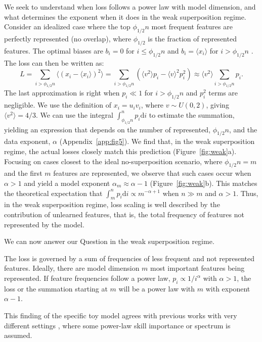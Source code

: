 \documentclass{article}
\begin{document}
We seek to understand when loss follows a power law with model dimension, and what determines the exponent when it does in the weak superposition regime.
Consider an idealized case where the top $\phi_{1/2} n$ most frequent features are perfectly represented (no overlap), where $\phi_{1/2}$ is the fraction of represented features. 
The optimal biases are $b_i = 0$ for $i\leq \phi_{1/2} n$ and $b_i = \langle x_i \rangle$ for $i > \phi_{1/2} n$ \cite{elhage2022superposition}.
The loss can then be written as:
\begin{equation}
L = \sum_{i>\phi_{1/2} n} \langle (x_i - \langle x_i \rangle)^2 \rangle =  \sum_{i>\phi_{1/2} n} (\langle v^2 \rangle p_i -\langle v \rangle^2 p_i^2) \approx \langle v^2 \rangle \sum_{i>\phi_{1/2} n} p_i.
\label{eq:unlearn}
\end{equation}
The last approximation is right when $p_i \ll 1$ for $i>\phi_{1/2} n$ and $p_i^2$ terms are negligible. We use the definition of $x_i = u_i v_i$, where $v \sim U(0,2)$, giving $\langle v^2 \rangle = 4/3$. We can use the integral $\int_{\phi_{1/2} n}^n p_i \mathrm{d}i$ to estimate the summation, yielding an expression that depends on the number of represented, $\phi_{1/2} n$, and the data exponent, $\alpha$ (Appendix~\ref{app:fig5}). We find that, in the weak superposition regime, the actual losses closely match this prediction (Figure~\ref{fig:weak}a). Focusing on cases closest to the ideal no-superposition scenario, where $\phi_{1/2} n = m$ and the first $m$ features are represented, we observe that such cases occur when $\alpha > 1$ and yield a model exponent $\alpha_m \approx \alpha - 1$ (Figure~\ref{fig:weak}b). This matches the theoretical expectation that $\int_m^n p_i \mathrm{d}i \propto m^{-\alpha + 1}$ when $n \gg m$ and $\alpha > 1$. Thus, in the weak superposition regime, loss scaling is well described by the contribution of unlearned features, that is, the total frequency of features not represented by the model.

We can now answer our Question in the weak superposition regime.
\begin{tcolorbox}[colframe=mitred, opacityback=0.9, title={Result 1: ``Power law in, power law out" in the weak superposition regime}]
The loss is governed by a sum of frequencies of less frequent and not represented features. Ideally, there are model dimension $m$ most important features being represented. If feature frequencies follow a power law, $p_i \propto 1/i^\alpha$ with $\alpha > 1$, the loss or the summation starting at $m$ will be a power law with $m$ with exponent $\alpha - 1$.
\end{tcolorbox}
This finding of the specific toy model agrees with previous works with very different settings \cite{bahri2024explaining,bordelon2020spectrum,bordelon2025feature,maloney2022solvable,hutter2021learning,michaud2023quantization}, where some power-law skill importance or spectrum is assumed.
\end{document}
